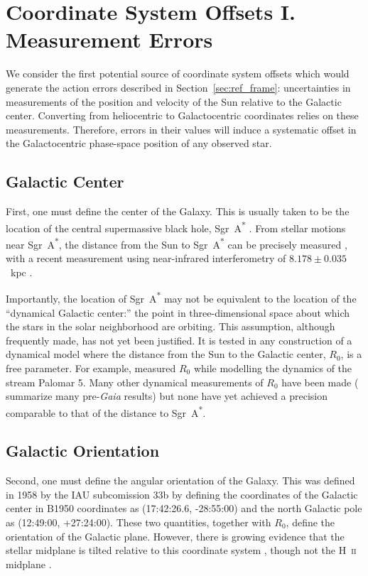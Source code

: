 \documentclass[twocolumn]{aastex62}
\begin{document}
\section{Coordinate System Offsets I. Measurement Errors} \label{sec:mes_err}
We consider the first potential source of coordinate system offsets which
would generate the action errors described in Section~\ref{sec:ref_frame}:
uncertainties in measurements of the position and velocity of the Sun relative to the Galactic center. Converting from
heliocentric to Galactocentric coordinates relies on these measurements.
Therefore, errors in their values will induce a systematic offset in the
Galactocentric phase-space position of any observed star.

\subsection{Galactic Center}
First, one must define the center of the Galaxy. This is usually taken to be
the location of the central supermassive black hole, Sgr~A\textsuperscript{*}
\citep[e.g.][]{2004ApJ...616..872R}. From stellar motions near
Sgr~A\textsuperscript{*}, the distance from the Sun to Sgr~A\textsuperscript{*} can
be precisely measured \citep{2009ApJ...692.1075G, 2018AA...615L..15G}, with a recent
measurement using near-infrared interferometry of $8.178 \pm 0.035$~kpc
\citep{2019arXiv190405721A}.

Importantly, the location of Sgr~A\textsuperscript{*} may not be equivalent to the location of the ``dynamical Galactic center:'' the point in three-dimensional
space about which the stars in the solar neighborhood are orbiting. This assumption, although frequently made, has not yet been justified. It is tested in any construction of a  dynamical model where the distance from the Sun to
the Galactic center, $R_0$, is a free parameter.
For example, \citet{2015ApJ...803...80K} measured $R_0$ while
modelling the dynamics of the stream Palomar 5. Many other dynamical measurements
of $R_0$ have been made (\citealt{2016ARAA..54..529B} summarize many pre-{\em Gaia} results) but none have yet achieved a precision comparable to that of the distance to Sgr~A\textsuperscript{*}.

\subsection{Galactic Orientation}
Second, one must define the angular orientation of the Galaxy. This
was defined in 1958 by the IAU subcomission 33b \citep{1960MNRAS.121..123B} by
defining the coordinates of the Galactic center in B1950 coordinates as
(17:42:26.6, -28:55:00) and the north Galactic pole as (12:49:00, +27:24:00). These two quantities, together with $R_0$, define the orientation of the Galactic plane.
However, there is growing evidence that the stellar midplane is tilted relative to this coordinate system \citep{2014ApJ...797...53G, 2016ARAA..54..529B}, though not
the H~\textsc{ii} midplane \citep{2019ApJ...871..145A}.
\end{document}
